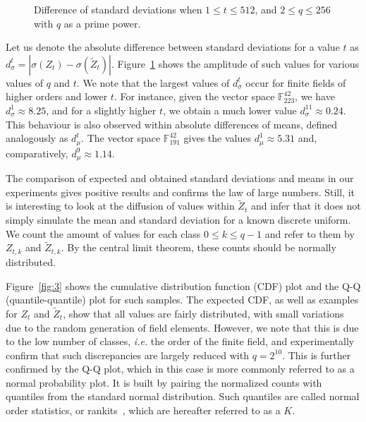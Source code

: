 \documentclass[draft, 12pt, a4paper, oneside]{memoir}
\theoremstyle{definition}
\theoremstyle{remark}
\begin{document}
\begin{figure}[ht]
  \subfloat[
    $d_{\sigma}^{t}$ for $n = 42, v_{1} = 17$.\label{fig:2a}
  ]{
  }
  \subfloat[
    $d_{\sigma}^{t}$ for $n = 90, v_{1} = 35$.\label{fig:2b}
  ]{
  }
  \caption{Difference of standard deviations when $1 \leq t \leq 512$,
    and $2 \leq q \leq 256$ with $q$ as a prime power.}\label{fig:2}
\end{figure}

Let us denote the absolute difference between standard deviations for a value
$t$ as $d_{\sigma}^{t} = |\sigma(Z_{t}) - \sigma(\widetilde{Z}_{t})|$.
Figure~\ref{fig:2} shows the amplitude of such values for various values of $q$
and $t$. We note that the largest values of $d_{\sigma}^{t}$ occur for finite
fields of higher orders and lower $t$. For instance, given the vector space
$\mathbb{F}_{223}^{42}$, we have $d_{\sigma}^{1} \approx 8.25$, and for a
slightly higher $t$, we obtain a much lower value
$d_{\sigma}^{11} \approx 0.24$. This behaviour is also observed within absolute
differences of means, defined analogously as $d_{\mu}^{t}$. The vector space
$\mathbb{F}_{191}^{42}$ gives the values $d_{\mu}^{1} \approx 5.31$ and,
comparatively, $d_{\mu}^{9} \approx 1.14$.

The comparison of expected and obtained standard deviations and means in our
experiments gives positive results and confirms the law of large numbers.
Still, it is interesting to look at the diffusion of values within
$\widetilde{Z}_{t}$ and infer that it does not simply simulate the mean and
standard deviation for a known discrete uniform. We count the amount of values
for each class $0 \leq k \leq q - 1$ and refer to them by $Z_{t, k}$ and
$\widetilde{Z}_{t, k}$. By the central limit theorem, these counts should be
normally distributed.

Figure~\ref{fig:3} shows the cumulative distribution function (CDF) plot and
the Q-Q (quantile-quantile) plot for such samples. The expected CDF, as well as
examples for $Z_{t}$ and $\widetilde{Z}_{t}$, show that all values are fairly
distributed, with small variations due to the random generation of field
elements. However, we note that this is due to the low number of classes,
\emph{i.e.} the order of the finite field, and experimentally confirm that such
discrepancies are largely reduced with $q = 2^{10}$. This is further confirmed
by the Q-Q plot, which in this case is more commonly referred to as a normal probability plot. It is built by pairing the normalized counts with quantiles from the standard normal distribution. Such quantiles are called normal order statistics, or rankits~\cite{Ipsen:194405}, which are hereafter referred to as a $K$. 
\end{document}
